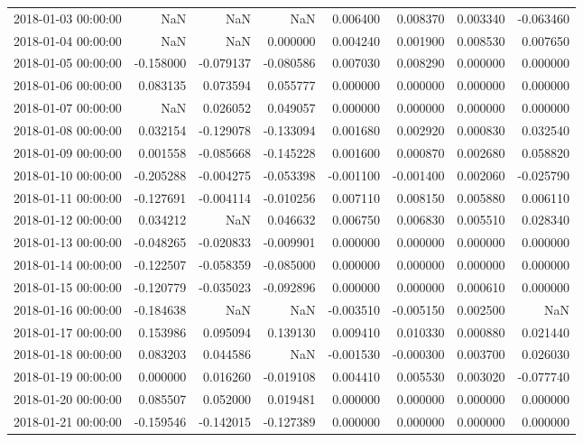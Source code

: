 \begin{tabular}{lrrrrrrr}
2018-01-03 00:00:00 & NaN & NaN & NaN & 0.006400 & 0.008370 & 0.003340 & -0.063460 \\
2018-01-04 00:00:00 & NaN & NaN & 0.000000 & 0.004240 & 0.001900 & 0.008530 & 0.007650 \\
2018-01-05 00:00:00 & -0.158000 & -0.079137 & -0.080586 & 0.007030 & 0.008290 & 0.000000 & 0.000000 \\
2018-01-06 00:00:00 & 0.083135 & 0.073594 & 0.055777 & 0.000000 & 0.000000 & 0.000000 & 0.000000 \\
2018-01-07 00:00:00 & NaN & 0.026052 & 0.049057 & 0.000000 & 0.000000 & 0.000000 & 0.000000 \\
2018-01-08 00:00:00 & 0.032154 & -0.129078 & -0.133094 & 0.001680 & 0.002920 & 0.000830 & 0.032540 \\
2018-01-09 00:00:00 & 0.001558 & -0.085668 & -0.145228 & 0.001600 & 0.000870 & 0.002680 & 0.058820 \\
2018-01-10 00:00:00 & -0.205288 & -0.004275 & -0.053398 & -0.001100 & -0.001400 & 0.002060 & -0.025790 \\
2018-01-11 00:00:00 & -0.127691 & -0.004114 & -0.010256 & 0.007110 & 0.008150 & 0.005880 & 0.006110 \\
2018-01-12 00:00:00 & 0.034212 & NaN & 0.046632 & 0.006750 & 0.006830 & 0.005510 & 0.028340 \\
2018-01-13 00:00:00 & -0.048265 & -0.020833 & -0.009901 & 0.000000 & 0.000000 & 0.000000 & 0.000000 \\
2018-01-14 00:00:00 & -0.122507 & -0.058359 & -0.085000 & 0.000000 & 0.000000 & 0.000000 & 0.000000 \\
2018-01-15 00:00:00 & -0.120779 & -0.035023 & -0.092896 & 0.000000 & 0.000000 & 0.000610 & 0.000000 \\
2018-01-16 00:00:00 & -0.184638 & NaN & NaN & -0.003510 & -0.005150 & 0.002500 & NaN \\
2018-01-17 00:00:00 & 0.153986 & 0.095094 & 0.139130 & 0.009410 & 0.010330 & 0.000880 & 0.021440 \\
2018-01-18 00:00:00 & 0.083203 & 0.044586 & NaN & -0.001530 & -0.000300 & 0.003700 & 0.026030 \\
2018-01-19 00:00:00 & 0.000000 & 0.016260 & -0.019108 & 0.004410 & 0.005530 & 0.003020 & -0.077740 \\
2018-01-20 00:00:00 & 0.085507 & 0.052000 & 0.019481 & 0.000000 & 0.000000 & 0.000000 & 0.000000 \\
2018-01-21 00:00:00 & -0.159546 & -0.142015 & -0.127389 & 0.000000 & 0.000000 & 0.000000 & 0.000000 \\

\end{tabular}
